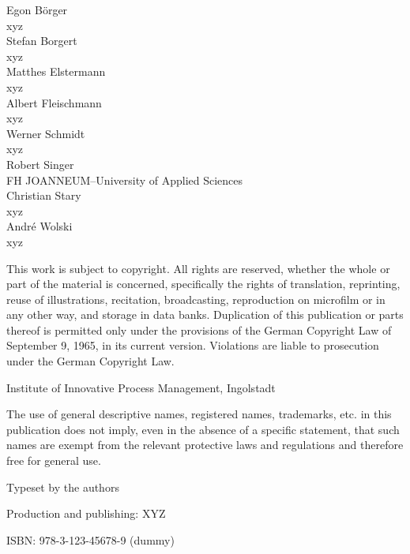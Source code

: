 \documentclass[11pt, showtrims, final]{memoir}
\begin{document}
\begingroup
\footnotesize
\setlength{\parindent}{0pt}
\setlength{\parskip}{\baselineskip}
\vspace*{3cm}
\begin{flushleft}
	Egon B\"orger\\
	xyz\\
	\medskip
	Stefan Borgert\\
	xyz\\
	\medskip
	Matthes Elstermann\\
	xyz\\
	\medskip
	Albert Fleischmann\\
	xyz\\
	\medskip
	Werner Schmidt\\
	xyz\\
	\medskip
	Robert Singer\\
	FH JOANNEUM--University of Applied Sciences\\
	\medskip
	Christian Stary\\
	xyz\\
	\medskip
	André Wolski\\
	xyz\\
\end{flushleft}
\vspace*{\fill}
This work is subject to copyright. All rights are reserved, whether the whole or part of the material is concerned, specifically the rights of translation, reprinting, reuse of illustrations, recitation, broadcasting, reproduction on microfilm or in any other way, and storage in data banks. Duplication of this publication or parts thereof is permitted only under the provisions of the German Copyright Law of September 9, 1965, in its current version. Violations
are liable to prosecution under the German Copyright Law.\par
{} Institute of Innovative Process Management, Ingolstadt\par
The use of general descriptive names, registered names, trademarks, etc. in this publication does not imply, even in the absence of a specific statement, that such names are exempt from the relevant protective laws and regulations and therefore free for general use.\par
Typeset by the authors\par
Production and publishing: XYZ\par
ISBN: 978-3-123-45678-9 (dummy)
\endgroup
\clearpage

\pagestyle{companion}
\end{document}
